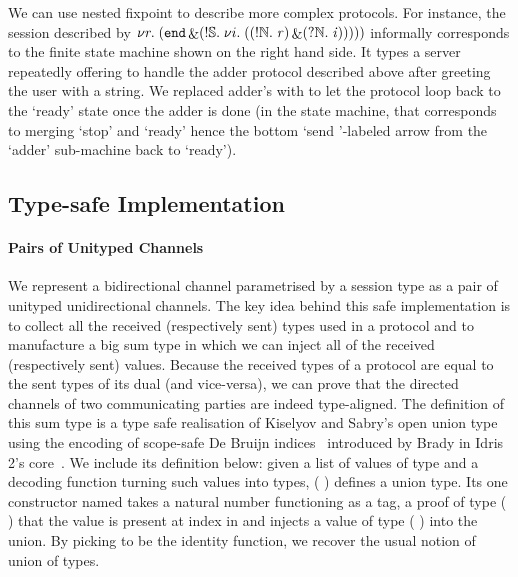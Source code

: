 \documentclass{easychair}
\begin{document}
We can use nested fixpoint to describe more complex
protocols. For instance, the session described by
$
\nu r.\;(\mathtt{end} \mathop{\&} (!\mathbb{S}.\;\nu i.\;((!\mathbb{N}.\;\mathit{r}) \mathop{\&} (?\mathbb{N}.\;\mathit{i}))
  )))
$
informally corresponds to the finite state machine
shown on the right hand side.
%
It types a server repeatedly offering to handle the adder
protocol described above after greeting the user with a string.
We replaced adder's \stopsesh{} with  to let the protocol
loop back to the `ready' state once the adder is done
(in the state machine, that corresponds to merging `stop'
and `ready' hence the bottom `send \nat'-labeled arrow from the
`adder' sub-machine back to `ready').


\subsection*{Type-safe Implementation}

\paragraph{Pairs of Unityped Channels}
We represent a bidirectional channel parametrised by a session
type as a pair of unityped unidirectional channels.
%
The key idea behind this safe implementation is to collect
all the received (respectively sent) types used in a protocol
and to manufacture a big sum type in which we can inject all
of the received (respectively sent) values.
%
Because the received types of a protocol are equal to the sent
types of its dual (and vice-versa), we can prove that the directed
channels of two communicating parties are indeed type-aligned.
%
The definition of this sum type is a type safe realisation of
Kiselyov and Sabry's open union type~\cite{DBLP:conf/haskell/KiselyovSS13}
using the encoding of scope-safe
De Bruijn indices~\cite{MANUAL:journals/math/debruijn72}
introduced by Brady in Idris 2's core~\cite{DBLP:conf/ecoop/Brady21}.
%
We include its definition below: given
a list  of values of type 
and a decoding function  turning such values into types,
(  )
defines a union type.
Its one constructor named  takes a natural
number  functioning as a tag,
a proof of type
(   )
that the value  is present at index 
in  and injects a value of type ( )
into the union.
%
By picking  to be the identity function, we recover the
usual notion of union of types.
\end{document}
